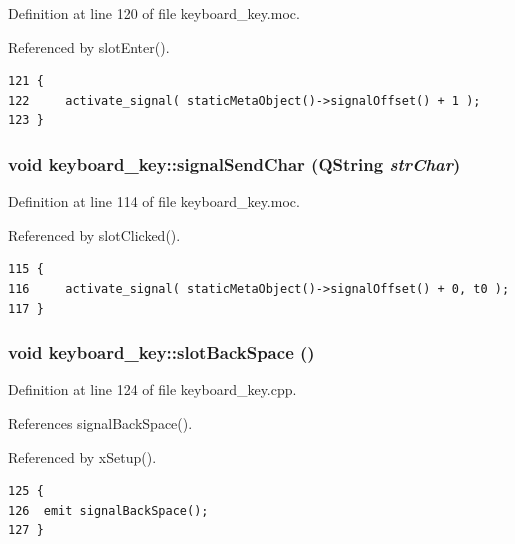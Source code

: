Definition at line 120 of file keyboard\_\-key.moc.

Referenced by slot\-Enter().



\footnotesize\begin{verbatim}121 {
122     activate_signal( staticMetaObject()->signalOffset() + 1 );
123 }
\end{verbatim}\normalsize 
{}
\subsubsection{\setlength{\rightskip}{0pt plus 5cm}void keyboard\_\-key::signal\-Send\-Char (QString {\em str\-Char})\hspace{0.3cm}{\tt  [signal]}}\label{classkeyboard__key_keyboard__keyl0}




Definition at line 114 of file keyboard\_\-key.moc.

Referenced by slot\-Clicked().



\footnotesize\begin{verbatim}115 {
116     activate_signal( staticMetaObject()->signalOffset() + 0, t0 );
117 }
\end{verbatim}\normalsize 
{}
\subsubsection{\setlength{\rightskip}{0pt plus 5cm}void keyboard\_\-key::slot\-Back\-Space ()\hspace{0.3cm}{\tt  [slot]}}\label{classkeyboard__key_keyboard__keyi6}




Definition at line 124 of file keyboard\_\-key.cpp.

References signal\-Back\-Space().

Referenced by x\-Setup().



\footnotesize\begin{verbatim}125 {
126  emit signalBackSpace();
127 }
\end{verbatim}\normalsize 
{}
